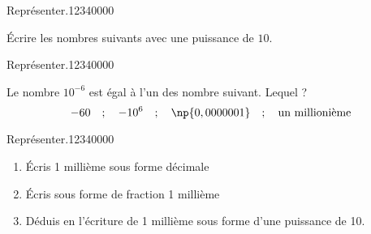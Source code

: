 \begin{pageAD} 



\begin{ExoCad}{Représenter.}{1234}{0}{0}{0}{0}

Écrire les nombres suivants avec une puissance de $10$.

\begin{enumerate}
\begin{minipage}{0.3\linewidth}
\item 
\item
\end{minipage}
\begin{minipage}{0.3\linewidth}
\item 
\item
\end{minipage}
\begin{minipage}{0.3\linewidth}
\item 
\item
\end{minipage}
\end{enumerate}
\end{ExoCad}

\begin{ExoCad}{Représenter.}{1234}{0}{0}{0}{0}

Le nombre $10^{-6}$ est égal à l'un des nombre suivant. Lequel ?
$$ -60 \quad ;  \quad -10^6 \quad ; \quad \np{0,000 0001}  \quad ; \quad \text{un millionième}$$

\end{ExoCad}


\begin{ExoCad}{Représenter.}{1234}{0}{0}{0}{0}
\begin{enumerate}
\item Écris 1 millième sous forme décimale
\item Écris sous forme de fraction 1 millième
\item Déduis en l'écriture de 1 millième sous forme d'une puissance de 10.
\end{enumerate}
\end{ExoCad}




\end{pageAD}
